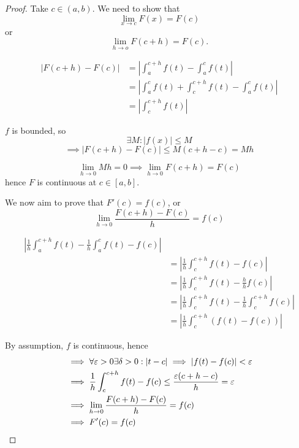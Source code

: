 \documentclass[a4paper,10pt]{article}
\begin{document}
\begin{proof}
	Take $c \in (a,b)$. We need to show that
	\[ \lim_{x \to c} F(x) = F(c) \]
	or
	\[ \lim_{h \to o} F(c+h) = F(c). \]

	\begin{align*}
		|F(c+h) - F(c)| &= \left| \int_a^{c+h} f(t) - \int_a^c f(t) \right| \\
				&= \left| \int_a^c f(t) + \int_c^{c+h} f(t) - \int_a^c f(t) \right| \\
			 	&= \left| \int_c^{c+h} f(t) \right|
	\end{align*}

	$f$ is bounded, so
	\[ \exists M : |f(x)| \leq M \]
	\[ \implies | F(c+h) - F(c) | \leq M(c+h-c) = Mh \]

	\[ \lim_{h \to 0} Mh = 0 \implies \lim_{h \to 0} F(c+h) = F(c) \]
	hence $F$ is continuous at $c \in [a,b]$.

	We now aim to prove that $F'(c) = f(c)$, or
	\[ \lim_{h \to 0} \frac{F(c+h) - F(c)}{h} = f(c) \]

	\begin{align*}
		\left|\frac{1}{h} \int_a^{c+h} f(t) - \frac{1}{h} \int_a^c f(t) - f(c) \right| \\
		&= \left| \frac{1}{h} \int_c^{c+h} f(t) - f(c) \right| \\
		&= \left| \frac{1}{h} \int_c^{c+h} f(t) - \frac{h}{h} f(c) \right| \\
		&= \left| \frac{1}{h} \int_c^{c+h} f(t) - \frac{1}{h} \int_c^{c+h} f(c) \right| \\
		&= \left| \frac{1}{h} \int_c^{c+h} (f(t) - f(c)) \right|
	\end{align*}

	By assumption, $f$ is continuous, hence
	\begin{align*}
		&\implies \forall \varepsilon > 0 \exists \delta > 0 : |t-c| \implies |f(t)-f(c)| < \varepsilon \\
		&\implies \frac{1}{h} \int_c^{c+h} f(t) - f(c) \leq \frac{\varepsilon(c+h-c)}{h} = \varepsilon \\
		&\implies \lim_{h \to 0} \frac{F(c+h) - F(c)}{h} = f(c) \\
		&\implies F'(c) = f(c)
	\end{align*}
\end{proof}
\end{document}
